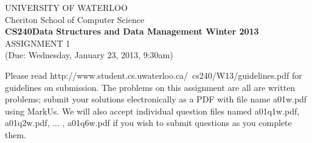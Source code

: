 \documentclass[12pt]{article}
\begin{document}
%
%
\begin{center}
UNIVERSITY OF WATERLOO\\
Cheriton School of Computer Science\\[\baselineskip]
{\bf CS240\hfill Data Structures and Data Management \hfill
Winter 2013}\\[\baselineskip]
{\sc \large ASSIGNMENT 1}\\
(Due: Wednesday, January 23, 2013, 9:30am)\\[2\baselineskip]
\end{center}
%
%

\noindent
Please read http://www.student.cs.uwaterloo.ca/~cs240/W13/guidelines.pdf for
guidelines on submission. The problems on this assignment are all are written problems; submit your solutions
electronically as a PDF with file name a01w.pdf using MarkUs. We will also accept individual question files named a01q1w.pdf, a01q2w.pdf, ... , a01q6w.pdf if you wish to submit questions as you complete them.
\noindent
\end{document}
